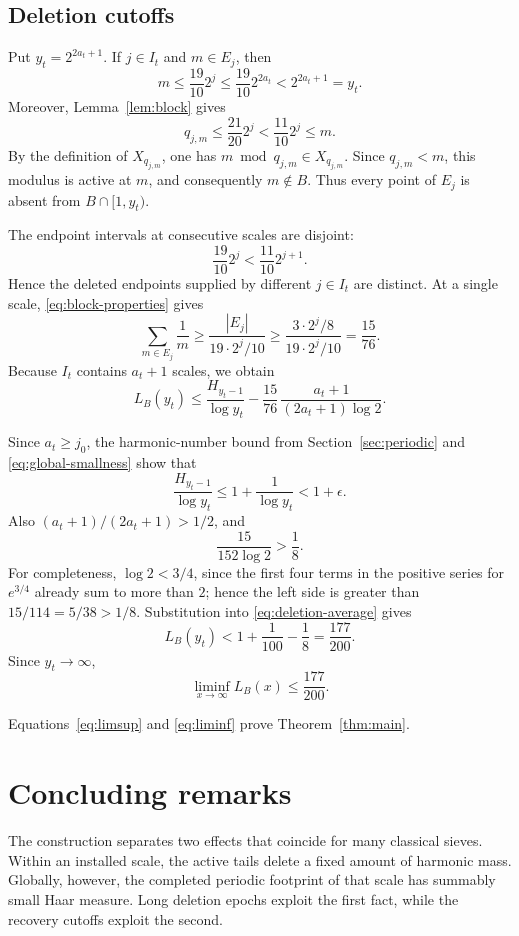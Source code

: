 \documentclass[11pt]{article}
\numberwithin{equation}{section}
\theoremstyle{definition}
\theoremstyle{remark}
\begin{document}
\subsection{Deletion cutoffs}

Put \(y_t=2^{2a_t+1}\).  If \(j\in I_t\) and \(m\in E_j\), then
\[
 m\le\frac{19}{10}2^j
 \le\frac{19}{10}2^{2a_t}
 <2^{2a_t+1}=y_t.
\]
Moreover, Lemma~\ref{lem:block} gives
\[
 q_{j,m}\le\frac{21}{20}2^j
 <\frac{11}{10}2^j\le m.
\]
By the definition of \(X_{q_{j,m}}\), one has
\(m\bmod q_{j,m}\in X_{q_{j,m}}\).  Since \(q_{j,m}<m\), this modulus is
active at \(m\), and consequently \(m\notin B\).  Thus every point of
\(E_j\) is absent from \(B\cap[1,y_t)\).

The endpoint intervals at consecutive scales are disjoint:
\[
 \frac{19}{10}2^j<\frac{11}{10}2^{j+1}.
\]
Hence the deleted endpoints supplied by different \(j\in I_t\) are
distinct.  At a single scale, \eqref{eq:block-properties} gives
\[
 \sum_{m\in E_j}\frac1m
 \ge\frac{|E_j|}{19\cdot2^j/10}
 \ge\frac{3\cdot2^j/8}{19\cdot2^j/10}
 =\frac{15}{76}.
\]
Because \(I_t\) contains \(a_t+1\) scales, we obtain
\begin{equation}\label{eq:deletion-average}
 L_B(y_t)
 \le\frac{H_{y_t-1}}{\log y_t}
 -\frac{15}{76}\,
   \frac{a_t+1}{(2a_t+1)\log2}.
\end{equation}

Since \(a_t\ge j_0\), the harmonic-number bound from
Section~\ref{sec:periodic} and \eqref{eq:global-smallness} show that
\[
 \frac{H_{y_t-1}}{\log y_t}
 \le1+\frac1{\log y_t}<1+\epsilon.
\]
Also \((a_t+1)/(2a_t+1)>1/2\), and
\[
 \frac{15}{152\log2}>\frac18.
\]
For completeness, \(\log2<3/4\), since the first four terms in the
positive series for \(e^{3/4}\) already sum to more than \(2\); hence the
left side is greater than \(15/114=5/38>1/8\).  Substitution into
\eqref{eq:deletion-average} gives
\[
 L_B(y_t)
 <1+\frac1{100}-\frac18
 =\frac{177}{200}.
\]
Since \(y_t\to\infty\),
\begin{equation}\label{eq:liminf}
 \liminf_{x\to\infty}L_B(x)\le\frac{177}{200}.
\end{equation}

Equations~\eqref{eq:limsup} and \eqref{eq:liminf} prove
Theorem~\ref{thm:main}.

\section{Concluding remarks}

The construction separates two effects that coincide for many classical
sieves.  Within an installed scale, the active tails delete a fixed amount
of harmonic mass.  Globally, however, the completed periodic footprint of
that scale has summably small Haar measure.  Long deletion epochs exploit
the first fact, while the recovery cutoffs exploit the second.
\end{document}
